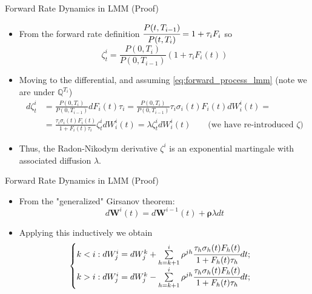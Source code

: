 \documentclass{beamer}
\begin{document}
\begin{frame}{Forward Rate Dynamics in LMM (Proof)}
  	\begin{itemize}
  	\item<1-> From the forward rate definition $\cfrac{P(t,T_{i-1})}{P(t,T_i)} = 1 + \tau_i F_i$ so
    	\begin{equation*}
      	\zeta^i_t = \frac{P(0, T_i)}{P(0, T_{i-1})}(1+\tau_i F_i(t))
    	\end{equation*}
   	\item Moving to the differential, and assuming \cref{eq:forward_process_lmm} (note we are under $\mathbb{Q}^{T_i}$)
    \begin{equation*}
      \begin{aligned}
	d\zeta^i_t &= \frac{P(0, T_i)}{P(0, T_{i-1})}dF_i(t)\tau_i = \frac{P(0, T_i)}{P(0, T_{i-1})}\tau_i\sigma_i(t)F_i(t)dW^i_i(t) = \\ &= \frac{\tau_i\sigma_i(t)F_i(t)}{1+F_i(t)\tau_i}\zeta_t^idW^i_i(t)=\lambda \zeta_t^idW^i_i(t) \quad\quad \text{(we have re-introduced $\zeta$)}
      \end{aligned}
    \end{equation*}
  \item<2-> Thus, the Radon-Nikodym derivative $\zeta^i$ is an exponential martingale with associated diffusion $\lambda$. %
  \end{itemize}
\end{frame}

\begin{frame}{Forward Rate Dynamics in LMM (Proof)}
  \begin{itemize}
  \item<1-> From the "generalized" Girsanov theorem:
    \begin{equation*}
      d\bm{W}^i(t) = d\bm{W}^{i-1}(t)+\bm{\rho}\lambda dt
    \end{equation*}
  \item<2-> Applying this inductively we obtain
    \begin{equation*}
  	\begin{cases}
	k < i : dW^i_j = dW^k_j + \sum\limits_{h=k+1}^i \rho^{jh}\cfrac{\tau_h\sigma_h(t)F_h(t)}{1+F_h(t)\tau_h} dt;\\
	k > i : dW^i_j = dW^k_j - \sum\limits_{h=k+1}^i \rho^{jh}\cfrac{\tau_h\sigma_h(t)F_h(t)}{1+F_h(t)\tau_h} dt;\\
  	\end{cases}
    \end{equation*}
  \end{itemize}
\end{frame}
\end{document}
